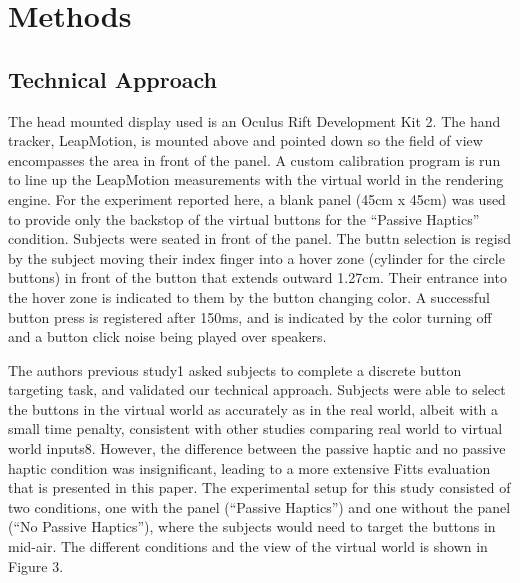 \documentclass[]{aiaa-tc}%
\begin{document}
\section{Methods}
\subsection{Technical Approach}
The head mounted display used is an Oculus Rift Development Kit 2.
The hand tracker, LeapMotion, is mounted above and pointed down so the field of view encompasses the area in front of the panel.
A custom calibration program is run to line up the LeapMotion measurements with the virtual world in the rendering engine.
For the experiment reported here, a blank panel (45cm x 45cm) was used to provide only the backstop of the virtual buttons for the ``Passive Haptics'' condition.
Subjects were seated in front of the panel.
The buttn selection is regisd by the subject moving their index finger into a hover zone (cylinder for the circle buttons) in front of the button that extends outward 1.27cm.
Their entrance into the hover zone is indicated to them by the button changing color.
A successful button press is registered after 150ms, and is indicated by the color turning off and a button click noise being played over speakers.

The authors previous study1 asked subjects to complete a discrete button targeting task, and validated our technical approach.
Subjects were able to select the buttons in the virtual world as accurately as in the real world, albeit with a small time penalty, consistent with other studies comparing real world to virtual world inputs8.
However, the difference between the passive haptic and no passive haptic condition was insignificant, leading to a more extensive Fitts evaluation that is presented in this paper.
The experimental setup for this study consisted of two conditions, one with the panel (``Passive Haptics'') and one without the panel (``No Passive Haptics''), where the subjects would need to target the buttons in mid-air.
The different conditions and the view of the virtual world is shown in Figure 3.
\end{document}
